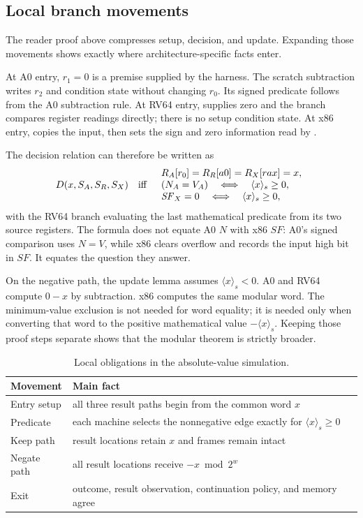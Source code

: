\subsection{Local branch movements}

The reader proof above compresses setup, decision, and update. Expanding those
movements shows exactly where architecture-specific facts enter.

At A0 entry, \(r_1=0\) is a premise supplied by the harness. The scratch
subtraction writes \(r_2\) and condition state without changing \(r_0\). Its
signed predicate follows from the A0 subtraction rule. At RV64 entry,
 supplies zero and the
branch compares register readings directly; there is no setup condition state.
At x86 entry,  copies the input, then 
sets the sign and zero information read by .

The decision relation can therefore be written as
\[
 D(x,S_A,S_R,S_X)
 \quad\hbox{iff}\quad
 \begin{array}{l}
 R_A[r_0]=R_R[a0]=R_X[rax]=x,\\
 (N_A=V_A)\quad\Longleftrightarrow\quad \langle x\rangle_s\ge0,\\
 \mathit{SF}_X=0\quad\Longleftrightarrow\quad \langle x\rangle_s\ge0,
 \end{array}
\]
with the RV64 branch evaluating the last mathematical predicate from its two
source registers. The formula does not equate A0 \(N\) with x86 \(SF\): A0's
signed comparison uses \(N=V\), while x86  clears overflow and
records the input high bit in \(SF\). It equates the question they answer.

On the negative path, the update lemma assumes \(\langle x\rangle_s<0\). A0
and RV64 compute \(0-x\) by subtraction. x86  computes the same
modular word. The minimum-value exclusion is not needed for word equality; it
is needed only when converting that word to the positive mathematical value
\(-\langle x\rangle_s\). Keeping those proof steps separate shows that the
modular theorem is strictly broader.

\begin{table}[htbp]
\centering
\caption{Local obligations in the absolute-value simulation.}
\begin{tabular}{@{}p{}p{}@{}}
\toprule
Movement & Main fact \\
\midrule
Entry setup & all three result paths begin from the common word \(x\) \\
Predicate & each machine selects the nonnegative edge exactly for \(\langle x\rangle_s\ge0\) \\
Keep path & result locations retain \(x\) and frames remain intact \\
Negate path & all result locations receive \(-x\bmod2^w\) \\
Exit & outcome, result observation, continuation policy, and memory agree \\
\bottomrule
\end{tabular}
\end{table}

